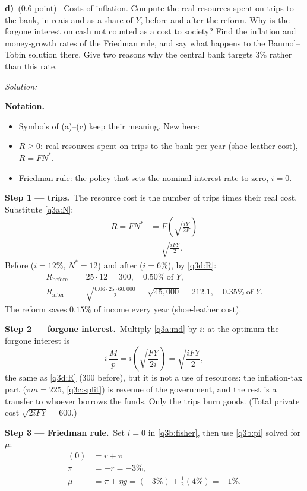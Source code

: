 \documentclass[11pt,a4paper]{article}
\newif\ifsolucoes
\newcommand{\espacoresol}{6cm}
\newcommand{\parte}[2]{\par\Needspace{6\baselineskip}\medskip\noindent\textbf{#1)}~(#2)~}
\newcommand{\resolespaco}{\ifsolucoes\else\par\textit{Solution:}\vspace{\espacoresol}\par\fi}
\newcommand{\passo}[2]{\par\smallskip\noindent\textbf{Step #1.}~#2}
\newenvironment{notacao}{\par\smallskip\noindent\textbf{Notation.}\begin{itemize}[leftmargin=1.4em,topsep=1pt,itemsep=0pt]\small}{\end{itemize}}
\begin{document}
\parte{d}{0.6 point} Costs of inflation. Compute the real resources spent on trips to the bank, in reais and as a
share of $Y$, before and after the reform. Why is the forgone interest on cash not counted as a cost to society?
Find the inflation and money-growth rates of the Friedman rule, and say what happens to the Baumol--Tobin solution
there. Give two reasons why the central bank targets 3\% rather than this rate.
\resolespaco
\begin{sol}
\begin{notacao}
\item Symbols of (a)--(c) keep their meaning. New here:
\item $R\ge0$: real resources spent on trips to the bank per year (shoe-leather cost), $R=FN^*$.
\item Friedman rule: the policy that sets the nominal interest rate to zero, $i=0$.
\end{notacao}
\passo{1 --- trips}{The resource cost is the number of trips times their real cost. Substitute
\eqref{q3a:N}:
\begin{align}
R=FN^* &= F\left(\sqrt{\frac{iY}{2F}}\right)\nonumber\\
&= \boxed{\sqrt{\frac{iFY}{2}}}. \label{q3d:R}
\end{align}
Before ($i=12\%$, $N^*=12$) and after ($i=6\%$), by \eqref{q3d:R}:
\begin{align*}
R_{\text{before}} &= 25\cdot12=\boxed{300},\quad 0.50\%\ \text{of }Y,\\
R_{\text{after}} &= \sqrt{\frac{0.06\cdot25\cdot60{,}000}{2}}=\sqrt{45{,}000}=\boxed{212.1},\quad 0.35\%\ \text{of }Y.
\end{align*}
The reform saves $0.15\%$ of income every year (shoe-leather cost).}
\passo{2 --- forgone interest}{Multiply \eqref{q3a:md} by $i$: at the optimum the forgone interest is
\[
i\,\frac Mp=i\left(\sqrt{\frac{FY}{2i}}\right)=\sqrt{\frac{iFY}{2}},
\]
the same as \eqref{q3d:R} (300 before), but it is not a use of resources: the inflation-tax part
($\pi m=225$, \eqref{q3c:split}) is revenue of the government, and the rest is a transfer to whoever borrows the
funds. Only the trips burn goods. (Total private cost $\sqrt{2iFY}=600$.)}
\passo{3 --- Friedman rule}{Set $i=0$ in \eqref{q3b:fisher}, then use \eqref{q3b:pi} solved for $\mu$:
\begin{align*}
(0) &= r+\pi\\
\pi &= -r=\boxed{-3\%},\\
\mu &= \pi+\eta g=(-3\%)+\tfrac12(4\%)=\boxed{-1\%}.
\end{align*}
}
\end{sol}
\end{document}
